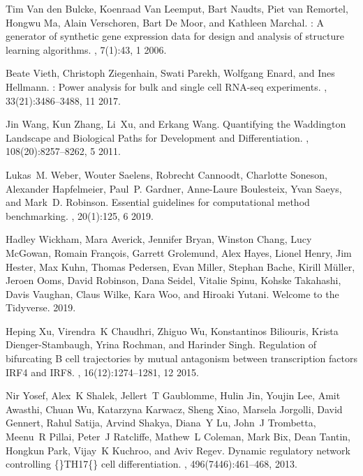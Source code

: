 \documentclass[10pt, a4paper]{article}
\begin{document}
\begin{thebibliography}{10}
	Tim {Van den Bulcke}, Koenraad {Van Leemput}, Bart Naudts, Piet {van Remortel},
	Hongwu Ma, Alain Verschoren, Bart {De Moor}, and Kathleen Marchal.
	: A generator of synthetic gene expression data for design
	and analysis of structure learning algorithms.
	, 7(1):43, 1 2006.
	
	Beate Vieth, Christoph Ziegenhain, Swati Parekh, Wolfgang Enard, and Ines
	Hellmann.
	: Power analysis for bulk and single cell {{RNA}}-seq
	experiments.
	, 33(21):3486--3488, 11 2017.
	
	Jin Wang, Kun Zhang, Li~Xu, and Erkang Wang.
	\newblock Quantifying the {{Waddington Landscape}} and {{Biological Paths}} for
	{{Development}} and {{Differentiation}}.
	,
	108(20):8257--8262, 5 2011.
	
	Lukas~M. Weber, Wouter Saelens, Robrecht Cannoodt, Charlotte Soneson, Alexander
	Hapfelmeier, Paul~P. Gardner, Anne-Laure Boulesteix, Yvan Saeys, and Mark~D.
	Robinson.
	\newblock Essential guidelines for computational method benchmarking.
	, 20(1):125, 6 2019.
	
	Hadley Wickham, Mara Averick, Jennifer Bryan, Winston Chang, Lucy McGowan,
	Romain Fran{\c c}ois, Garrett Grolemund, Alex Hayes, Lionel Henry, Jim
	Hester, Max Kuhn, Thomas Pedersen, Evan Miller, Stephan Bache, Kirill
	M{\"u}ller, Jeroen Ooms, David Robinson, Dana Seidel, Vitalie Spinu, Kohske
	Takahashi, Davis Vaughan, Claus Wilke, Kara Woo, and Hiroaki Yutani.
	\newblock Welcome to the {{Tidyverse}}.
	 2019.
	
	Heping Xu, Virendra~K Chaudhri, Zhiguo Wu, Konstantinos Biliouris, Krista
	Dienger-Stambaugh, Yrina Rochman, and Harinder Singh.
	\newblock Regulation of bifurcating {{B}} cell trajectories by mutual
	antagonism between transcription factors {{IRF4}} and {{IRF8}}.
	, 16(12):1274--1281, 12 2015.
	
	Nir Yosef, Alex~K Shalek, Jellert~T Gaublomme, Hulin Jin, Youjin Lee, Amit
	Awasthi, Chuan Wu, Katarzyna Karwacz, Sheng Xiao, Marsela Jorgolli, David
	Gennert, Rahul Satija, Arvind Shakya, Diana~Y Lu, John~J Trombetta, Meenu~R
	Pillai, Peter~J Ratcliffe, Mathew~L Coleman, Mark Bix, Dean Tantin, Hongkun
	Park, Vijay~K Kuchroo, and Aviv Regev.
	\newblock Dynamic regulatory network controlling
	\{\vphantom\}{{TH17}}\vphantom\{\} cell differentiation.
	, 496(7446):461--468, 2013.
	

\end{thebibliography}
\end{document}
